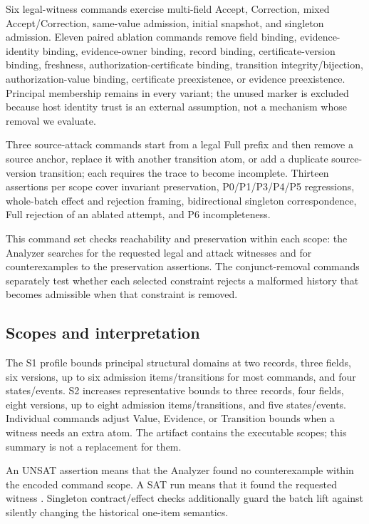 Six legal-witness commands exercise multi-field Accept, Correction, mixed Accept/Correction, same-value admission, initial snapshot, and singleton admission. Eleven paired ablation commands remove field binding, evidence-identity binding, evidence-owner binding, record binding, certificate-version binding, freshness, authorization-certificate binding, transition integrity/bijection, authorization-value binding, certificate preexistence, or evidence preexistence. Principal membership remains in every variant; the unused  marker is excluded because host identity trust is an external assumption, not a mechanism whose removal we evaluate.

Three source-attack commands start from a legal Full prefix and then remove a source anchor, replace it with another transition atom, or add a duplicate source-version transition; each requires the trace to become incomplete. Thirteen assertions per scope cover invariant preservation, P0/P1/P3/P4/P5 regressions, whole-batch effect and rejection framing, bidirectional singleton correspondence, Full rejection of an ablated attempt, and P6 incompleteness.

This command set checks reachability and preservation within each scope: the Analyzer searches for the requested legal and attack witnesses and for counterexamples to the preservation assertions. The conjunct-removal commands separately test whether each selected constraint rejects a malformed history that becomes admissible when that constraint is removed.

\subsection{Scopes and interpretation}

The S1 profile bounds principal structural domains at two records, three fields, six versions, up to six admission items/transitions for most commands, and four states/events. S2 increases representative bounds to three records, four fields, eight versions, up to eight admission items/transitions, and five states/events. Individual commands adjust Value, Evidence, or Transition bounds when a witness needs an extra atom. The artifact contains the executable scopes; this summary is not a replacement for them.



An UNSAT assertion means that the Analyzer found no counterexample within the encoded command scope. A SAT run means that it found the requested witness \citep{jackson2002alloy,torlak2007kodkod}. Singleton contract/effect checks additionally guard the batch lift against silently changing the historical one-item semantics.
